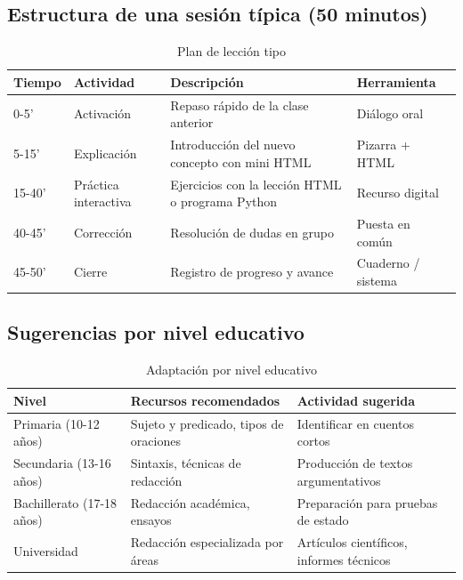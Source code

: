 \documentclass[12pt,spanish]{article}
\begin{document}
\subsection{Estructura de una sesión típica (50 minutos)}

\begin{table}[H]
\centering
\caption{Plan de lección tipo}
\label{tab:sesion}
\begin{tabular}{|p{2.5cm}|p{4cm}|p{5cm}|p{2.5cm}|}
\hline
\textbf{Tiempo} & \textbf{Actividad} & \textbf{Descripción} & \textbf{Herramienta} \\
\hline
0-5' & Activación & Repaso rápido de la clase anterior & Diálogo oral \\
\hline
5-15' & Explicación & Introducción del nuevo concepto con mini HTML & Pizarra + HTML \\
\hline
15-40' & Práctica interactiva & Ejercicios con la lección HTML o programa Python & Recurso digital \\
\hline
40-45' & Corrección & Resolución de dudas en grupo & Puesta en común \\
\hline
45-50' & Cierre & Registro de progreso y avance & Cuaderno / sistema \\
\hline
\end{tabular}
\end{table}

\subsection{Sugerencias por nivel educativo}

\begin{table}[H]
\centering
\caption{Adaptación por nivel educativo}
\label{tab:niveles}
\begin{tabular}{|p{3cm}|p{5cm}|p{6cm}|}
\hline
\textbf{Nivel} & \textbf{Recursos recomendados} & \textbf{Actividad sugerida} \\
\hline
Primaria (10-12 años) & Sujeto y predicado, tipos de oraciones & Identificar en cuentos cortos \\
\hline
Secundaria (13-16 años) & Sintaxis, técnicas de redacción & Producción de textos argumentativos \\
\hline
Bachillerato (17-18 años) & Redacción académica, ensayos & Preparación para pruebas de estado \\
\hline
Universidad & Redacción especializada por áreas & Artículos científicos, informes técnicos \\
\hline
\end{tabular}
\end{table}
\end{document}

